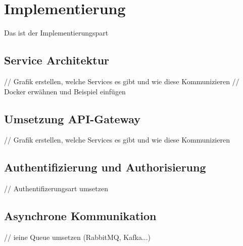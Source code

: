 \section{Implementierung}
Das ist der Implementierungspart


\subsection{Service Architektur}
// Grafik erstellen, welche Services es gibt und wie diese Kommunizieren 
// Docker erwähnen und Beispiel einfügen

\subsection{Umsetzung API-Gateway}
// Grafik erstellen, welche Services es gibt und wie diese Kommunizieren 

\subsection{Authentifizierung und Authorisierung}
// Authentifizerungsart umsetzen





\subsection{Asynchrone  Kommunikation}
// ieine Queue umsetzen (RabbitMQ, Kafka...)

